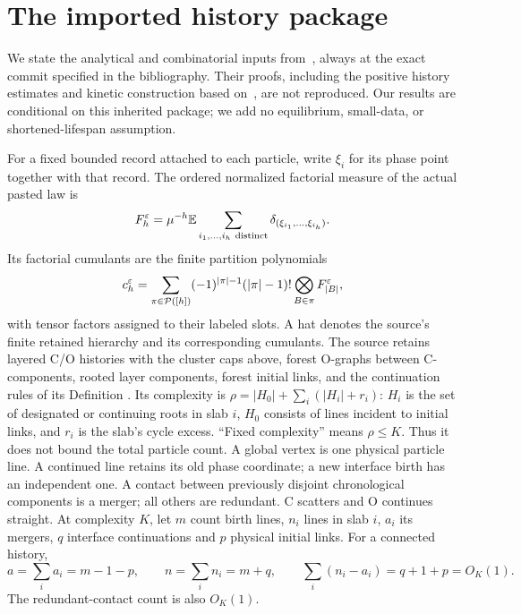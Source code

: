 \section{The imported history package}\label{sec:imports}
We state the analytical and combinatorial inputs from~\cite{U}, always
at the exact commit specified in the bibliography.
Their proofs, including the positive history estimates and kinetic
construction based on~\cite{DHM}, are not reproduced. Our results are
conditional on this inherited package; we add no equilibrium,
small-data, or shortened-lifespan assumption.

For a fixed bounded record attached to each particle, write $\xi_i$ for
its phase point together with that record. The ordered normalized
factorial measure of the actual pasted law is
\[
 F_h^\eps=\mu^{-h}\E\sum_{i_1,\ldots,i_h\ \text{distinct}}
           \delta_{(\xi_{i_1},\ldots,\xi_{i_h})}.
\]
Its factorial cumulants are the finite partition polynomials
\[
c_h^\varepsilon=\sum_{\pi\in\mathcal P([h])}
(-1)^{|\pi|-1}(|\pi|-1)!\bigotimes_{B\in\pi}F_{|B|}^\varepsilon,
\]
with tensor factors assigned to their labeled slots. A hat denotes the
source's finite retained hierarchy and its corresponding cumulants.
The source retains layered C/O histories with the cluster caps above,
forest O-graphs between C-components, rooted layer components, forest
initial links, and the continuation rules of its Definition
. Its complexity is
$\rho=|H_0|+\sum_i(|H_i|+r_i)$: $H_i$ is the set of designated or
continuing roots in slab $i$, $H_0$ consists of lines incident to initial
links, and $r_i$ is the slab's cycle excess. ``Fixed complexity'' means
$\rho\leq K$. Thus it does not bound the total particle count.
A global vertex is one physical particle line. A continued line retains
its old phase coordinate; a new interface birth has an independent one.
A contact between previously disjoint chronological components is a
merger; all others are redundant. C scatters and O continues straight.
At complexity $K$, let $m$ count birth lines, $n_i$ lines in slab $i$,
$a_i$ its mergers, $q$ interface continuations and $p$ physical initial
links. For a connected history,
\begin{equation}\label{eq:counts}
 a=\sum_i a_i=m-1-p,\qquad n=\sum_i n_i=m+q,\qquad
 \sum_i(n_i-a_i)=q+1+p=O_K(1).
\end{equation}
The redundant-contact count is also $O_K(1)$.

